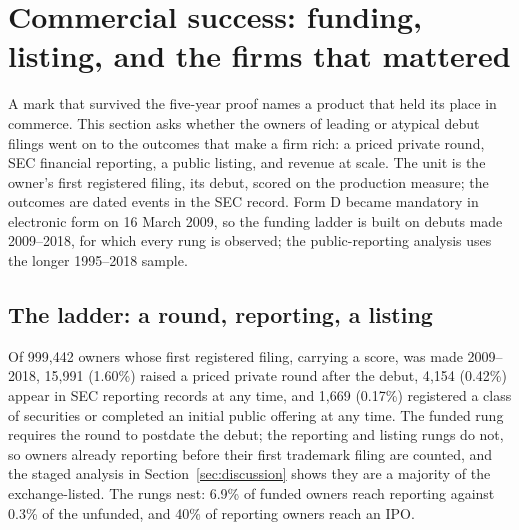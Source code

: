 \section{Commercial success: funding, listing, and the firms that mattered}\label{sec:success}

A mark that survived the five-year proof names a product that held its
place in commerce. This section asks whether the owners of leading or
atypical debut filings went on to the outcomes that make a firm rich: a
priced private round, SEC financial reporting, a public listing, and
revenue at scale. The unit is the owner's first registered filing, its
debut, scored on the production measure; the outcomes are dated events in
the SEC record. Form D became mandatory in electronic form on 16 March
2009, so the funding ladder is built on debuts made 2009--2018, for which
every rung is observed; the public-reporting analysis uses the longer
1995--2018 sample.

\subsection{The ladder: a round, reporting, a listing}\label{sec:ladder}

Of 999{,}442 owners whose first registered filing, carrying a score, was
made 2009--2018, 15{,}991 (1.60\%) raised a priced private round after the
debut, 4{,}154 (0.42\%) appear in SEC reporting records at any time, and
1{,}669 (0.17\%) registered a class of securities or completed an initial
public offering at any time. The funded rung requires the round to
postdate the debut; the reporting and listing rungs do not, so owners
already reporting before their first trademark filing are counted, and the
staged analysis in Section~\ref{sec:discussion} shows they are a majority
of the exchange-listed. The rungs nest: 6.9\% of funded owners reach
reporting against 0.3\% of the unfunded, and 40\% of reporting owners
reach an IPO.

